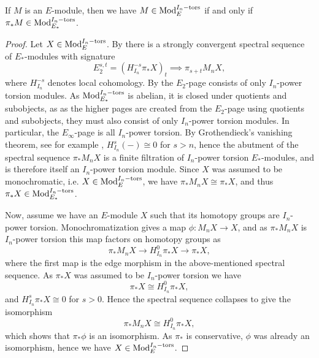 \begin{lemma}
    \label{ch1:lm:monochromatic-iff-torsion-modules}
    If $M$ is an $E$-module, then we have $M\in \mathrm{Mod}_{E}^{I_n-\mathrm{tors}}$ if and only if $\pi_* M\in \mathrm{Mod}_{E_*}^{I_n-\mathrm{tors}}$. 
\end{lemma}
\begin{proof}
    Let $X\in \mathrm{Mod}_{E}^{I_n-\mathrm{tors}}$. By \cite[3.19]{barthel-heard-valenzuela_2018} there is a strongly convergent spectral sequence of $E_*$-modules with signature 
    \[E_2^{s,t} = (H_{I_n}^{-s}\pi_* X)_t \implies \pi_{s+t}M_n X,\]
    where $H_{I_n}^{-s}$ denotes local cohomology. By \cite[2.1.3(ii)]{brodmann-sharp_1998} the $E_2$-page consists of only $I_n$-power torsion modules. As $\mathrm{Mod}_{E_*}^{I_n-\mathrm{tors}}$ is abelian, it is closed under quotients and subobjects, as as the higher pages are created from the $E_2$-page using quotients and subobjects, they must also consist of only $I_n$-power torsion modules. In particular, the $E_\infty$-page is all $I_n$-power torsion. By Grothendieck's vanishing theorem, see for example \cite[6.1.2]{brodmann-sharp_1998}, $H_{I_n}^s(-)\cong 0$ for $s>n$, hence the abutment of the spectral sequence $\pi_* M_n X$ is a finite filtration of $I_n$-power torsion $E_*$-modules, and is therefore itself an $I_n$-power torsion module. Since $X$ was assumed to be monochromatic, i.e. $X\in \mathrm{Mod}_{E}^{I_n-\mathrm{tors}}$, we have $\pi_* M_n X\cong \pi_* X$, and thus $\pi_* X\in \mathrm{Mod}_{E_*}^{I_n-\mathrm{tors}}$. 

    Now, assume we have an $E$-module $X$ such that its homotopy groups are $I_n$-power torsion. Monochromatization gives a map $\phi\colon M_n X\longrightarrow X$, and as $\pi_*M_nX$ is $I_n$-power torsion this map factors on homotopy groups as 
    \[\pi_* M_n X\longrightarrow H^0_{I_n}\pi_* X\longrightarrow \pi_* X,\]
    where the first map is the edge morphism in the above-mentioned spectral sequence. As $\pi_* X$ was assumed to be $I_n$-power torsion we have 
    \[\pi_*X\cong H^0_{I_n}\pi_* X,\] 
    and $H^s_{I_n}\pi_* X \cong 0$ for $s>0$. Hence the spectral sequence collapses to give the isomorphism 
    \[\pi_* M_n X\cong H^0_{I_n}\pi_* X,\] 
    which shows that $\pi_* \phi$ is an isomorphism. As $\pi_*$ is conservative, $\phi$ was already an isomorphism, hence we have $X\in \mathrm{Mod}_{E}^{I_n-\mathrm{tors}}$. 
\end{proof}

